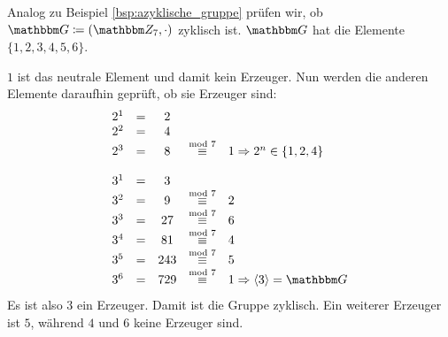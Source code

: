 \begin{beispiel}
  Analog zu Beispiel \ref{bsp:azyklische_gruppe} prüfen wir, ob $\G \coloneqq
  (\Z{7}, \cdot)$ zyklisch ist. $\G$ hat die Elemente $\{1, 2, 3, 4, 5,
  6\}$.

  $1$ ist das neutrale Element und damit kein Erzeuger. Nun werden die
  anderen Elemente daraufhin geprüft, ob sie Erzeuger sind:
\[  \begin{array}[]{ccccl}
    2^1 &= & 2 & &\\
    2^2 &= & 4 & &\\
    2^3 &= & 8 &\stackrel{\text{mod 7}}{\equiv}& 1 \Rightarrow 2^n \in \{1, 2, 4\}\\
\\    
    3^1 &= & 3 & &\\
    3^2 &= & 9  & \stackrel{\text{mod 7}}{\equiv}& 2\\
    3^3 &= & 27 & \stackrel{\text{mod 7}}{\equiv}& 6\\
    3^4 &= & 81 & \stackrel{\text{mod 7}}{\equiv}& 4\\
    3^5 &= & 243& \stackrel{\text{mod 7}}{\equiv}& 5\\
    3^6 &= & 729& \stackrel{\text{mod 7}}{\equiv}& 1 \Rightarrow \langle 3\rangle = \G
   \end{array}\]
  Es ist also $3$ ein Erzeuger. Damit ist die Gruppe zyklisch. Ein
  weiterer Erzeuger ist $5$, während $4$ und $6$ keine Erzeuger sind.

\end{beispiel}
